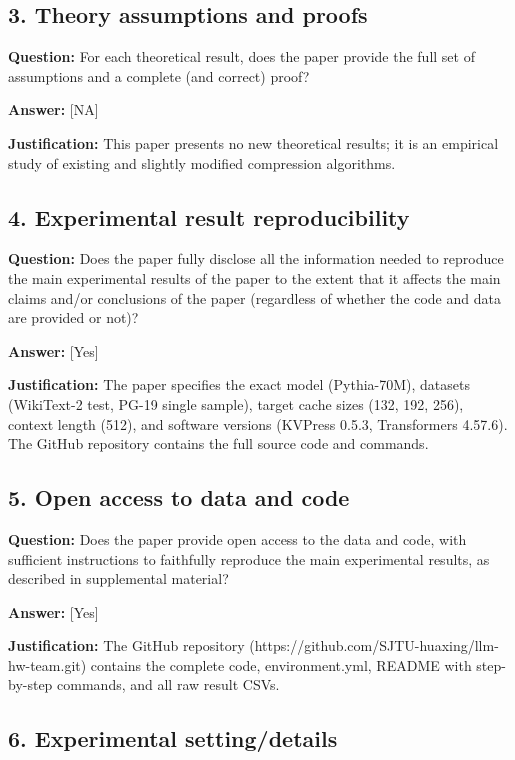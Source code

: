 \documentclass{article}
\begin{document}
\subsection*{3. Theory assumptions and proofs}

\textbf{Question:} For each theoretical result, does the paper provide the full set of assumptions and a complete (and correct) proof?

\textbf{Answer:} [NA]

\textbf{Justification:} This paper presents no new theoretical results; it is an empirical study of existing and slightly modified compression algorithms.

\subsection*{4. Experimental result reproducibility}

\textbf{Question:} Does the paper fully disclose all the information needed to reproduce the main experimental results of the paper to the extent that it affects the main claims and/or conclusions of the paper (regardless of whether the code and data are provided or not)?

\textbf{Answer:} [Yes]

\textbf{Justification:} The paper specifies the exact model (Pythia-70M), datasets (WikiText-2 test, PG-19 single sample), target cache sizes (132, 192, 256), context length (512), and software versions (KVPress 0.5.3, Transformers 4.57.6). The GitHub repository contains the full source code and commands.

\subsection*{5. Open access to data and code}

\textbf{Question:} Does the paper provide open access to the data and code, with sufficient instructions to faithfully reproduce the main experimental results, as described in supplemental material?

\textbf{Answer:} [Yes]

\textbf{Justification:} The GitHub repository (https://github.com/SJTU-huaxing/llm-hw-team.git) contains the complete code, environment.yml, README with step-by-step commands, and all raw result CSVs.

\subsection*{6. Experimental setting/details}
\end{document}
